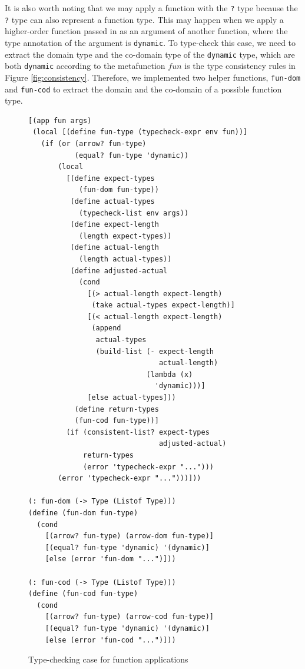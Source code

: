 It is also worth noting that we may apply a function with the {\tt ?} type because the {\tt ?} type can also represent a function type. This may happen when we apply a higher-order function passed in as an argument of another function, where the type annotation of the argument is {\tt dynamic}. To type-check this case, we need to extract the domain type and the co-domain type of the {\tt dynamic} type, which are both {\tt dynamic} according to the metafunction $fun$ is the type consistency rules in Figure \ref{fig:consistency}. Therefore, we implemented two helper functions, {\tt fun-dom} and {\tt fun-cod} to extract the domain and the co-domain of a possible function type.

\begin{figure}[h]
    \begin{lstlisting}[language=racket]
[(app fun args)
 (local [(define fun-type (typecheck-expr env fun))]
   (if (or (arrow? fun-type)
           (equal? fun-type 'dynamic))
       (local
         [(define expect-types
            (fun-dom fun-type))
          (define actual-types
            (typecheck-list env args))
          (define expect-length
            (length expect-types))
          (define actual-length
            (length actual-types))
          (define adjusted-actual
            (cond
              [(> actual-length expect-length)
               (take actual-types expect-length)]
              [(< actual-length expect-length)
               (append
                actual-types
                (build-list (- expect-length
                               actual-length)
                            (lambda (x)
                              'dynamic)))]
              [else actual-types]))
           (define return-types
           (fun-cod fun-type))]
         (if (consistent-list? expect-types
                               adjusted-actual)
             return-types
             (error 'typecheck-expr "...")))
       (error 'typecheck-expr "...")))]))

(: fun-dom (-> Type (Listof Type)))
(define (fun-dom fun-type)
  (cond
    [(arrow? fun-type) (arrow-dom fun-type)]
    [(equal? fun-type 'dynamic) '(dynamic)]
    [else (error 'fun-dom "...")]))

(: fun-cod (-> Type (Listof Type)))
(define (fun-cod fun-type)
  (cond
    [(arrow? fun-type) (arrow-cod fun-type)]
    [(equal? fun-type 'dynamic) '(dynamic)]
    [else (error 'fun-cod "...")]))
    \end{lstlisting}
    \caption[]{Type-checking case for function applications}
    \label{fig:app}
\end{figure}

